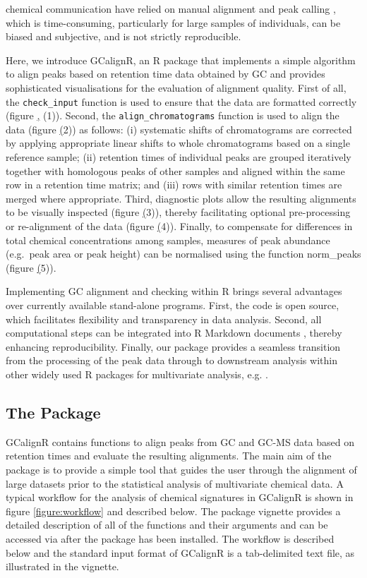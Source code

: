 chemical communication have relied on manual alignment and peak calling
\citep{Drea.2013}, which is time-consuming, particularly for large
samples of individuals, can be biased and subjective, and is not
strictly reproducible. \par
Here, we introduce GCalignR, an R package that implements a simple
algorithm to align peaks based on retention time data obtained by GC and
provides sophisticated visualisations for the evaluation of alignment
quality. First of all, the \texttt{check\_input} function is used to
ensure that the data are formatted correctly (figure
\href{figure:workflow}, (1)). Second, the \texttt{align\_chromatograms}
function is used to align the data (figure \href{figure:workflow} (2))
as follows: (i) systematic shifts of chromatograms are corrected by
applying appropriate linear shifts to whole chromatograms based on a
single reference sample; (ii) retention times of individual peaks are
grouped iteratively together with homologous peaks of other samples and
aligned within the same row in a retention time matrix; and (iii) rows
with similar retention times are merged where appropriate. Third,
diagnostic plots allow the resulting alignments to be visually inspected
(figure \href{figure:workflow} (3)), thereby facilitating optional
pre-processing or re-alignment of the data (figure
\href{figure:workflow} (4)). Finally, to compensate for differences in
total chemical concentrations among samples, measures of peak abundance
(e.g.~peak area or peak height) can be normalised using the function
norm\_peaks (figure \href{figure:workflow} (5)). \par
Implementing GC alignment and checking within R brings several
advantages over currently available stand-alone programs. First, the
code is open source, which facilitates flexibility and transparency in
data analysis. Second, all computational steps can be integrated into R
Markdown documents \citep{Allaire.2016}, thereby enhancing
reproducibility. Finally, our package provides a seamless transition
from the processing of the peak data through to downstream analysis
within other widely used R packages for multivariate analysis, e.g.
\href{https://CRAN.R-project.org/package=vegan}{}
\citep{Oksanen.2016}.

\subsection{The Package}\label{the-package}

GCalignR contains functions to align peaks from GC and GC-MS data based
on retention times and evaluate the resulting alignments. The main aim
of the package is to provide a simple tool that guides the user through
the alignment of large datasets prior to the statistical analysis of
multivariate chemical data. A typical workflow for the analysis of
chemical signatures in GCalignR is shown in figure \ref{figure:workflow}
and described below. The package vignette provides a detailed
description of all of the functions and their arguments and can be
accessed via  after the package has
been installed. The workflow is described below and the standard input
format of GCalignR is a tab-delimited text file, as illustrated in the
vignette.


